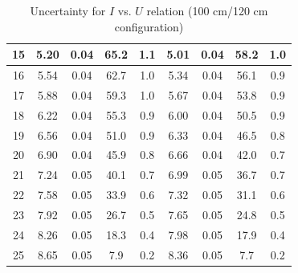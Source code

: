 \documentclass[12pt]{article}
\begin{document}
\begin{table}[H]
\begin{tabular}{|c|c|c|c|c|c|c|c|c|}
15 & 5.20  &0.04      & 65.2&1.1         & 5.01&0.04        & 58.2 &1.0        \\ \hline
16 & 5.54  &0.04      & 62.7&1.0         & 5.34&0.04        & 56.1 &0.9        \\ \hline
17 & 5.88  &0.04      & 59.3&1.0         & 5.67&0.04        & 53.8 &0.9        \\ \hline
18 & 6.22  &0.04      & 55.3&0.9         & 6.00&0.04        & 50.5 &0.9        \\ \hline
19 & 6.56  &0.04      & 51.0&0.9         & 6.33&0.04        & 46.5 &0.8        \\ \hline
20 & 6.90  &0.04      & 45.9&0.8         & 6.66&0.04        & 42.0 &0.7        \\ \hline
21 & 7.24  &0.05      & 40.1&0.7         & 6.99&0.05        & 36.7 &0.7        \\ \hline
22 & 7.58  &0.05      & 33.9&0.6         & 7.32&0.05       & 31.1  &0.6       \\ \hline
23 & 7.92  &0.05      & 26.7&0.5         & 7.65&0.05        & 24.8 &0.5        \\ \hline
24 & 8.26  &0.05      & 18.3&0.4         & 7.98&0.05        & 17.9 &0.4        \\ \hline
25 & 8.65  &0.05      & 7.9&0.2          & 8.36&0.05        & 7.7  &0.2        \\ \hline
\end{tabular}
\caption{Uncertainty for $I$ vs. $U$ relation (100 cm/120 cm configuration)}
\end{table}
\end{document}
